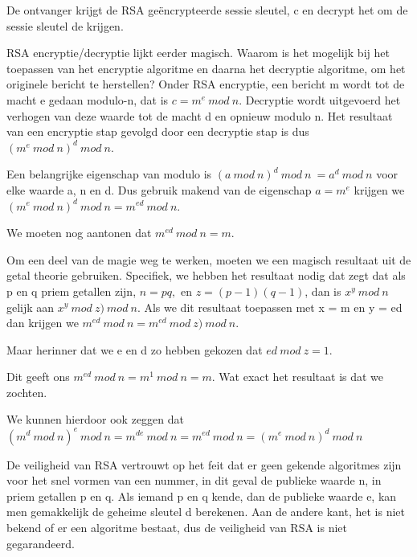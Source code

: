 \noindent De ontvanger krijgt de RSA geëncrypteerde sessie sleutel, c en decrypt het om de sessie sleutel de krijgen.




RSA encryptie/decryptie lijkt eerder magisch. Waarom is het mogelijk bij het toepassen van het encryptie algoritme en daarna het decryptie algoritme, om het originele bericht te herstellen? 
Onder RSA encryptie, een bericht m wordt tot de macht e gedaan modulo-n, dat is $c = m^e\ mod\ n$.
Decryptie wordt uitgevoerd het verhogen van deze waarde tot de macht d en opnieuw modulo n. Het resultaat van een encryptie stap gevolgd door een decryptie stap is dus $(m^e\ mod\ n)^d\ mod\ n$.

\noindent Een belangrijke eigenschap van modulo is $(a\ mod\ n)^d\ mod\ n\ = a^d\ mod\ n$ voor elke waarde a, n en d. Dus gebruik makend van de eigenschap $a = m^e$ krijgen we $(m^e\ mod\ n)^d\ mod\ n = m^{ed}\ mod\ n$.

\noindent We moeten nog aantonen dat $m^{ed}\ mod\ n = m$.

\noindent Om een deel van de magie weg te werken, moeten we een magisch resultaat uit de getal theorie gebruiken. Specifiek, we hebben het resultaat nodig dat zegt dat als p en q priem getallen zijn, $n = pq, $ en $ z = (p - 1)(q - 1)$, dan is $x^y\ mod\ n$ gelijk aan $x^{y}\ mod\ z) \ mod\ n$. Als we dit resultaat toepassen met x = m en y = ed dan krijgen we $m^{ed}\ mod\ n = m^{ed}\ mod\ z) \ mod\ n$.

\noindent Maar herinner dat we e en d zo hebben gekozen dat $ed\ mod\ z = 1$. 

\noindent Dit geeft ons $m^{ed}\ mod\ n = m^1\ mod\ n = m$. Wat exact het resultaat is dat we zochten. 

\noindent We kunnen hierdoor ook zeggen dat $(m^d\ mod\ n)^e\ mod\ n = m^{de}\ mod\ n = m^{ed}\ mod\ n = (m^e\ mod\ n)^d\ mod\ n$

\noindent De veiligheid van RSA vertrouwt op het feit dat er geen gekende algoritmes zijn voor het snel vormen van een nummer, in dit geval de publieke waarde n, in priem getallen p en q. Als iemand p en q kende, dan de publieke waarde e, kan men gemakkelijk de geheime sleutel d berekenen.
Aan de andere kant, het is niet bekend of er een algoritme bestaat, dus de veiligheid van RSA is niet gegarandeerd.
